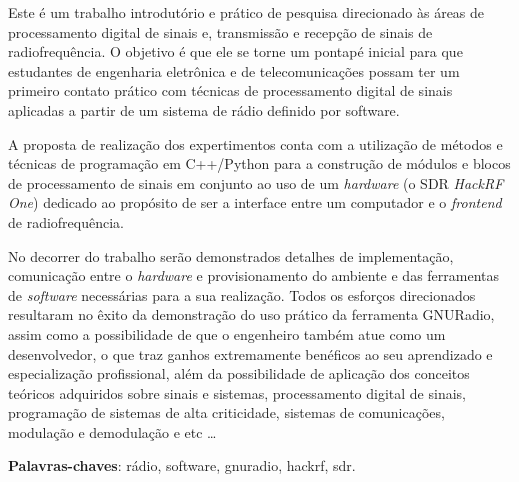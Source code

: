 \documentclass[
  12pt,				%
  openright,			%
  twoside,			%
  a4paper,			%
  english,			%
  french,				%
  spanish,			%
  brazil,				%
  ]{abntex2}
\begin{document}

\setlength{\absparsep}{18pt} %
\begin{resumo}

  Este é um trabalho introdutório e prático de pesquisa direcionado às áreas de processamento digital de sinais e, transmissão e recepção de sinais de radiofrequência.
  O objetivo é que ele se torne um pontapé inicial para que estudantes de engenharia eletrônica e de telecomunicações possam ter um primeiro contato prático com
  técnicas de processamento digital de sinais aplicadas a partir de um sistema de rádio definido por software.

  A proposta de realização dos expertimentos conta com a  utilização de métodos e técnicas de programação em C++/Python para a construção de módulos e blocos de processamento
  de sinais em conjunto ao uso de um \textit{hardware} (o SDR \textit{HackRF One}) dedicado ao propósito de ser a interface entre um computador e o \textit{frontend} de radiofrequência.

  No decorrer do trabalho serão demonstrados detalhes de implementação, comunicação entre o \textit{hardware} e provisionamento do ambiente e das ferramentas de
  \textit{software} necessárias para a sua realização. Todos os esforços direcionados resultaram no êxito da demonstração do uso prático da ferramenta GNURadio, assim como
  a possibilidade de que o engenheiro também atue como um desenvolvedor, o que traz ganhos extremamente benéficos ao seu aprendizado e especialização profissional, além da
  possibilidade de aplicação dos conceitos teóricos adquiridos sobre sinais e sistemas, processamento digital de sinais, programação de sistemas de alta criticidade, sistemas
  de comunicações, modulação e demodulação e etc \ldots

  \noindent
  \textbf{Palavras-chaves}: rádio, software, gnuradio, hackrf, sdr.
\end{resumo}

\listoffigures*
\cleardoublepage

\listoftables*
\cleardoublepage
\end{document}
